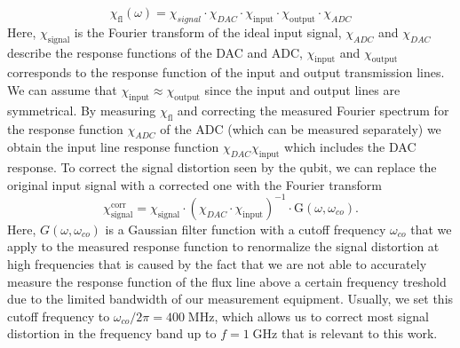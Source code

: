 %
\begin{equation}
\chi_{\mathrm{fl}}(\omega) = \chi_{signal}\cdot \chi_{DAC}\cdot \chi_{\mathrm{input}} \cdot \chi_{\mathrm{output}}\cdot\chi_{ADC} \label{eq:flux_response}
\end{equation}
%
Here, $\chi_{\mathrm{signal}}$ is the Fourier transform of the ideal input signal, $\chi_{ADC}$ and $\chi_{DAC}$ describe the response functions of the DAC and ADC, $\chi_{\mathrm{input}}$ and $\chi_{\mathrm{output}}$ corresponds to the response function of the input and output transmission lines. We can assume that $\chi_{\mathrm{input}}\approx\chi_{\mathrm{output}}$ since the input and output lines are symmetrical. By measuring $\chi_{\mathrm{fl}}$ and correcting the measured Fourier spectrum for the response function $\chi_{ADC}$ of the ADC (which can be measured separately) we obtain the input line response function $\chi_{DAC}\chi_{\mathrm{input}}$ which includes the DAC response. To correct the signal distortion seen by the qubit, we can replace the original input signal with a corrected one with the Fourier transform
%
\begin{equation}
\chi_{\mathrm{signal}}^{\mathrm{corr}} = \chi_{\mathrm{signal}}\cdot (\chi_{DAC}\cdot\chi_{\mathrm{input}})^{-1}\cdot \mathrm{G}(\omega,\omega_{co}).
\end{equation}
%
Here, $G(\omega,\omega_{co})$ is a Gaussian filter function with a cutoff frequency $\omega_{co}$ that we apply to the measured response function to renormalize the signal distortion at high frequencies that is caused by the fact that we are not able to accurately measure the response function of the flux line above a certain frequency treshold due to the limited bandwidth of our measurement equipment. Usually, we set this cutoff frequency to $\omega_{co}/2\pi=400\;\mathrm{MHz}$, which allows us to correct most signal distortion in the frequency band up to $f=1\;\mathrm{GHz}$ that is relevant to this work.

\smallskip

